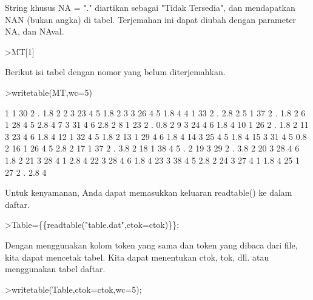 \documentclass[a4paper,10pt]{article}
\begin{document}
\begin{eulernotebook}
\begin{eulercomment}
\begin{eulercomment}
\begin{eulercomment}
String khusus NA = "." diartikan sebagai "Tidak Tersedia", dan
mendapatkan NAN (bukan angka) di tabel. Terjemahan ini dapat diubah
dengan parameter NA, dan NAval.
\end{eulercomment}
\begin{eulerprompt}
>MT[1]
\end{eulerprompt}
\begin{euleroutput}
  [1,  1,  30,  2,  NAN,  1.8,  2]
\end{euleroutput}
\begin{eulercomment}
Berikut isi tabel dengan nomor yang belum diterjemahkan.
\end{eulercomment}
\begin{eulerprompt}
>writetable(MT,wc=5)
\end{eulerprompt}
\begin{euleroutput}
      1    1   30    2    .  1.8    2
      2    3   23    4    5  1.8    2
      3    3   26    4    5  1.8    4
      4    1   33    2    .  2.8    2
      5    1   37    2    .  1.8    2
      6    1   28    4    5  2.8    4
      7    3   31    4    6  2.8    2
      8    1   23    2    .  0.8    2
      9    3   24    4    6  1.8    4
     10    1   26    2    .  1.8    2
     11    3   23    4    6  1.8    4
     12    1   32    4    5  1.8    2
     13    1   29    4    6  1.8    4
     14    3   25    4    5  1.8    4
     15    3   31    4    5  0.8    2
     16    1   26    4    5  2.8    2
     17    1   37    2    .  3.8    2
     18    1   38    4    5    .    2
     19    3   29    2    .  3.8    2
     20    3   28    4    6  1.8    2
     21    3   28    4    1  2.8    4
     22    3   28    4    6  1.8    4
     23    3   38    4    5  2.8    2
     24    3   27    4    1  1.8    4
     25    1   27    2    .  2.8    4
\end{euleroutput}
\begin{eulercomment}
Untuk kenyamanan, Anda dapat memasukkan keluaran readtable() ke dalam
daftar.
\end{eulercomment}
\begin{eulerprompt}
>Table=\{\{readtable("table.dat",ctok=ctok)\}\};
\end{eulerprompt}
\begin{eulercomment}
Dengan menggunakan kolom token yang sama dan token yang dibaca dari
file, kita dapat mencetak tabel. Kita dapat menentukan ctok, tok, dll.
atau menggunakan tabel daftar.
\end{eulercomment}
\begin{eulerprompt}
>writetable(Table,ctok=ctok,wc=5);

\end{eulerprompt}
\end{eulercomment}
\end{eulercomment}
\end{eulernotebook}
\end{document}
